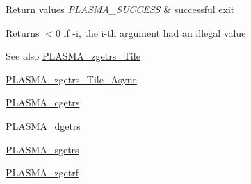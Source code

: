 \begin{DoxyRetVals}{Return values}
{\em P\+L\+A\+S\+M\+A\+\_\+\+S\+U\+C\+C\+E\+S\+S} & successful exit \\
\hline
\end{DoxyRetVals}
\begin{DoxyReturn}{Returns}
$<$0 if -\/i, the i-\/th argument had an illegal value
\end{DoxyReturn}
\begin{DoxySeeAlso}{See also}
\hyperlink{group__PLASMA__Complex64__t__Tile_ga143e5ed5a42b9fa3ae76b4df3258d071_ga143e5ed5a42b9fa3ae76b4df3258d071}{P\+L\+A\+S\+M\+A\+\_\+zgetrs\+\_\+\+Tile} 

\hyperlink{group__PLASMA__Complex64__t__Tile__Async_gac6868ef9d924faa37a9d6dd42462551c_gac6868ef9d924faa37a9d6dd42462551c}{P\+L\+A\+S\+M\+A\+\_\+zgetrs\+\_\+\+Tile\+\_\+\+Async} 

\hyperlink{group__PLASMA__Complex32__t_ga898ea98a3d182865980c7393dfca2c27_ga898ea98a3d182865980c7393dfca2c27}{P\+L\+A\+S\+M\+A\+\_\+cgetrs} 

\hyperlink{group__double_gaff3c22db4affbede58e22311320a2b85_gaff3c22db4affbede58e22311320a2b85}{P\+L\+A\+S\+M\+A\+\_\+dgetrs} 

\hyperlink{group__float_ga655cb742ac1c78e5ce86070f4ce1271b_ga655cb742ac1c78e5ce86070f4ce1271b}{P\+L\+A\+S\+M\+A\+\_\+sgetrs} 

\hyperlink{group__PLASMA__Complex64__t_ga03449aa4e83b2f2223dad281d122697d_ga03449aa4e83b2f2223dad281d122697d}{P\+L\+A\+S\+M\+A\+\_\+zgetrf} 
\end{DoxySeeAlso}
\hypertarget{group__PLASMA__Complex64__t_ga3af09862f7bf51c6f41e5220859f802d_ga3af09862f7bf51c6f41e5220859f802d}{}
